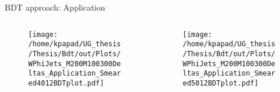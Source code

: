 \documentclass[bigger]{beamer}
\begin{document}
\begin{frame}[label={sec:org96ead05}]{BDT approach: Application}
\begin{columns}
\begin{column}{0.5\columnwidth}
\begin{figure}[h]
\centering
\texttt{[image: /home/kpapad/UG\_thesis/Thesis/Bdt/out/Plots/WPhiJets\_M200M100300Deltas\_Application\_Smeared4012BDTplot.pdf]}
\end{figure}
\end{column}
\begin{column}{0.5\columnwidth}
\begin{figure}[h]
\centering
\texttt{[image: /home/kpapad/UG\_thesis/Thesis/Bdt/out/Plots/WPhiJets\_M200M100300Deltas\_Application\_Smeared5012BDTplot.pdf]}
\end{figure}
\end{column}
\end{columns}
\end{frame}
\end{document}
